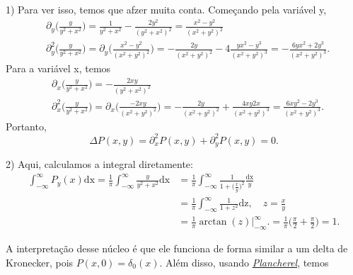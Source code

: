 \documentclass[../pde_notes.tex]{subfiles}
\begin{document}
\begin{proof*}
	1) Para ver isso, temos que afzer muita conta. Começando pela variável y,
	\begin{align*}
		 & \partial_y \biggl(\frac{y}{y^{2}+x^{2}}\biggr) = \frac{1}{y^{2}+x^{2}} - \frac{2y^{2}}{(y^{2}+x^{2})^{2}} = \frac{x^{2}-y^{2}}{(x^{2}+y^{2})^{2}}                                                                                             \\
		 & \partial_{y}^{2} \biggl(\frac{y}{y^{2}+x^{2}}\biggr) = \partial_y \biggl(\frac{x^{2}-y^{2}}{(x^{2}+y^{2})^{2}}\biggr) = -\frac{2y}{(x^{2}+y^{2})^{2}} - 4 \frac{yx^{2}-y^{3}}{(x^{2}+y^{2})^{3}} = -\frac{6yx^{2}+2y^{3}}{(x^{2}+y^{2})^{3}}.
	\end{align*}
	Para a variável x, temos
	\begin{align*}
		 & \partial_x \biggl(\frac{y}{y^{2}+x^{2}}\biggr) = -\frac{2xy}{(y^{2}+x^{2})^{2}}                                                                                                                                               \\
		 & \partial_{x}^{2} \biggl(\frac{y}{y^{2}+x^{2}}\biggr) = \partial_x \biggl(\frac{-2xy}{(x^{2}+y^{2})^{2}}\biggr) = -\frac{2y}{(x^{2}+y^{2})^{2}} + \frac{4xy 2x}{(x^{2}+y^{2})^{3}} = \frac{6xy^{2}-2y^{3}}{(x^{2}+y^{2})^{3}}.
	\end{align*}
	Portanto,
	\[
		\Delta P(x, y) = \partial_{x}^{2}P(x, y) + \partial_{y}^{2} P(x, y) = 0.
	\]

	2) Aqui, calculamos a integral diretamente:
	\begin{align*}
		\int_{-\infty}^{\infty}P_y(x) \mathrm{dx} = \frac{1}{\pi }\int_{-\infty}^{\infty}\frac{y}{y^{2}+x^{2}} \mathrm{dx} & = \frac{1}{\pi } \int_{-\infty}^{\infty}\frac{1}{1+\bigl(\frac{x}{y}\bigr)^{2}} \frac{\mathrm{dx}}{y}                        \\
		                                                                                                                   & = \frac{1}{\pi }\int_{-\infty}^{\infty}\frac{1}{1+z^{2}} \mathrm{dz},\quad z = \frac{x}{y}                                   \\
		                                                                                                                   & = \frac{1}{\pi }\arctan(z)\biggl|_{-\infty}^{\infty}\biggr. = \frac{1}{\pi }\biggl(\frac{\pi }{2}+\frac{\pi }{2}\biggr) = 1.
	\end{align*}
\end{proof*}
A interpretação desse núcleo é que ele funciona de forma similar a um delta de Kronecker, pois \(P(x, 0) = \delta_{0}(x)\). Além disso, usando \hyperlink{parseval_plancherel}{\textit{Plancherel}}, temos
\end{document}
